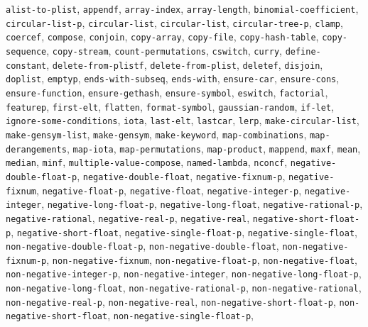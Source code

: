 \texttt{alist-to-plist}, 
\texttt{appendf}, 
\texttt{array-index}, 
\texttt{array-length}, 
\texttt{binomial-coefficient}, 
\texttt{circular-list-p}, 
\texttt{circular-list}, 
\texttt{circular-list}, 
\texttt{circular-tree-p}, 
\texttt{clamp}, 
\texttt{coercef}, 
\texttt{compose}, 
\texttt{conjoin}, 
\texttt{copy-array}, 
\texttt{copy-file}, 
\texttt{copy-hash-table}, 
\texttt{copy-sequence}, 
\texttt{copy-stream}, 
\texttt{count-permutations}, 
\texttt{cswitch}, 
\texttt{curry}, 
\texttt{define-constant}, 
\texttt{delete-from-plistf}, 
\texttt{delete-from-plist}, 
\texttt{deletef}, 
\texttt{disjoin}, 
\texttt{doplist}, 
\texttt{emptyp}, 
\texttt{ends-with-subseq}, 
\texttt{ends-with}, 
\texttt{ensure-car}, 
\texttt{ensure-cons}, 
\texttt{ensure-function}, 
\texttt{ensure-gethash}, 
\texttt{ensure-symbol}, 
\texttt{eswitch}, 
\texttt{factorial}, 
\texttt{featurep}, 
\texttt{first-elt}, 
\texttt{flatten}, 
\texttt{format-symbol}, 
\texttt{gaussian-random}, 
\texttt{if-let}, 
\texttt{ignore-some-conditions}, 
\texttt{iota}, 
\texttt{last-elt}, 
\texttt{lastcar}, 
\texttt{lerp}, 
\texttt{make-circular-list}, 
\texttt{make-gensym-list}, 
\texttt{make-gensym}, 
\texttt{make-keyword}, 
\texttt{map-combinations}, 
\texttt{map-derangements}, 
\texttt{map-iota}, 
\texttt{map-permutations}, 
\texttt{map-product}, 
\texttt{mappend}, 
\texttt{maxf}, 
\texttt{mean}, 
\texttt{median}, 
\texttt{minf}, 
\texttt{multiple-value-compose}, 
\texttt{named-lambda}, 
\texttt{nconcf}, 
\texttt{negative-double-float-p}, 
\texttt{negative-double-float}, 
\texttt{negative-fixnum-p}, 
\texttt{negative-fixnum}, 
\texttt{negative-float-p}, 
\texttt{negative-float}, 
\texttt{negative-integer-p}, 
\texttt{negative-integer}, 
\texttt{negative-long-float-p}, 
\texttt{negative-long-float}, 
\texttt{negative-rational-p}, 
\texttt{negative-rational}, 
\texttt{negative-real-p}, 
\texttt{negative-real}, 
\texttt{negative-short-float-p}, 
\texttt{negative-short-float}, 
\texttt{negative-single-float-p}, 
\texttt{negative-single-float}, 
\texttt{non-negative-double-float-p}, 
\texttt{non-negative-double-float}, 
\texttt{non-negative-fixnum-p}, 
\texttt{non-negative-fixnum}, 
\texttt{non-negative-float-p}, 
\texttt{non-negative-float}, 
\texttt{non-negative-integer-p}, 
\texttt{non-negative-integer}, 
\texttt{non-negative-long-float-p}, 
\texttt{non-negative-long-float}, 
\texttt{non-negative-rational-p}, 
\texttt{non-negative-rational}, 
\texttt{non-negative-real-p}, 
\texttt{non-negative-real}, 
\texttt{non-negative-short-float-p}, 
\texttt{non-negative-short-float}, 
\texttt{non-negative-single-float-p}, 

